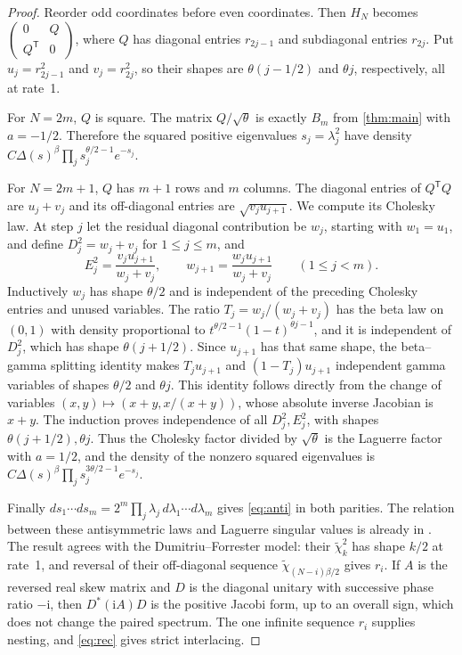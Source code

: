 \documentclass[10pt]{amsart}
\newcommand{\T}{\mathsf T}
\begin{document}
\begin{proof}
Reorder odd coordinates before even coordinates. Then
$H_N$ becomes $\left(\begin{smallmatrix}0&Q\\Q^\T&0\end{smallmatrix}\right)$,
where $Q$ has diagonal entries $r_{2j-1}$ and subdiagonal entries
$r_{2j}$. Put $u_j=r_{2j-1}^2$ and $v_j=r_{2j}^2$, so their
shapes are $\theta(j-1/2)$ and $\theta j$, respectively, all at rate~1.

For $N=2m$, $Q$ is square. The matrix $Q/\sqrt\theta$ is exactly
$B_m$ from \cref{thm:main} with $a=-1/2$. Therefore the squared
positive eigenvalues $s_j=\lambda_j^2$ have density
$C\Delta(s)^\beta\prod_j s_j^{\theta/2-1}e^{-s_j}$.

For $N=2m+1$, $Q$ has $m+1$ rows and $m$ columns.
The diagonal entries of $Q^\T Q$ are $u_j+v_j$ and its off-diagonal
entries are $\sqrt{v_j u_{j+1}}$. We compute its Cholesky law.
At step $j$ let the residual diagonal contribution be $w_j$,
starting with $w_1=u_1$, and define
$D_j^2=w_j+v_j$ for $1\leq j\leq m$, and
\[
 E_j^2=\frac{v_j u_{j+1}}{w_j+v_j},\qquad
 w_{j+1}=\frac{w_j u_{j+1}}{w_j+v_j}\qquad(1\leq j<m).
\]
Inductively $w_j$ has shape $\theta/2$ and is independent of
the preceding Cholesky entries and unused variables. The ratio
$T_j=w_j/(w_j+v_j)$ has the beta law on $(0,1)$ with density
proportional to $t^{\theta/2-1}(1-t)^{\theta j-1}$, and it is
independent of $D_j^2$, which has shape
$\theta(j+1/2)$. Since $u_{j+1}$ has that same shape, the
beta--gamma splitting identity makes $T_j u_{j+1}$ and
$(1-T_j)u_{j+1}$ independent gamma variables of shapes
$\theta/2$ and $\theta j$. This identity follows directly from
the change of variables $(x,y)\mapsto(x+y,x/(x+y))$, whose
absolute inverse Jacobian is $x+y$.
The induction proves independence of all $D_j^2,E_j^2$,
with shapes $\theta(j+1/2),\theta j$. Thus the Cholesky factor
divided by $\sqrt\theta$ is the Laguerre factor with $a=1/2$,
and the density of the nonzero squared eigenvalues is
$C\Delta(s)^\beta\prod_j s_j^{3\theta/2-1}e^{-s_j}$.

Finally $ds_1\cdots ds_m=2^m\prod_j\lambda_j\,d\lambda_1\cdots d\lambda_m$
gives \eqref{eq:anti} in both parities. The relation between these
antisymmetric laws and Laguerre singular values is already in
\cite[Section~6]{DF}. The result agrees with the
Dumitriu--Forrester model: their $\widetilde\chi_k^2$ has shape
$k/2$ at rate~1, and reversal of their off-diagonal sequence
$\widetilde\chi_{(N-i)\beta/2}$ gives $r_i$. If $A$ is the reversed
real skew matrix and $D$ is the diagonal unitary with successive phase
ratio $-\mathrm i$, then $D^*(\mathrm iA)D$ is the positive Jacobi form,
up to an overall sign, which does not change the paired spectrum.
The one infinite sequence $r_i$ supplies nesting, and
\eqref{eq:rec} gives strict interlacing.
\end{proof}
\end{document}
